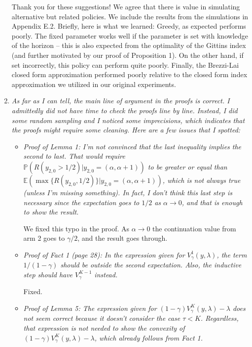 \documentclass[11pt]{article}
\newcommand{\1}{\ensuremath{\mathbf{1}}} %
\theoremstyle{thm-sf}
\begin{document}
\begin{enumerate}
	
	Thank you for these suggestions! We agree that there is value in simulating alternative but related policies. We include the results from the simulations in Appendix E.2. Briefly, here is what we learned: Greedy, as expected performs poorly. The fixed parameter works well if the parameter is set with knowledge of the horizon -- this is also expected from the optimality of the Gittins index (and further motivated by our proof of Proposition 1). On the other hand, if set incorrectly, this policy can perform quite poorly. Finally, the Brezzi-Lai closed form approximation performed poorly relative to the closed form index approximation we utilized in our original experiments. 
	
	

	\item {\it As far as I can tell, the main line of argument in the proofs is correct. I admittedly did not have time to check the proofs line by line. Instead, I did some random sampling and I noticed some imprecisions, which indicates that the proofs might require some cleaning. Here are a few issues that I spotted:}
		
		\begin{itemize}
			\item {\it Proof of Lemma 1: I'm not convinced that the last inequality implies the second to last.
			 That would require $\mathbb P(R(y_{2,0} > 1/2)| y_{2,0} = (\alpha, \alpha + 1))$ to be greater or equal than $\mathbb E (\max \{R(y_{2,0}, 1/2 )\} | y_{2,0} = (\alpha, \alpha + 1))$, which is not always true (unless I'm missing something).
			 In fact, I don't think this last step is necessary since the expectation goes to $1/2$ as $\alpha \to 0$, and that is enough to show the result.}
			 
			 We fixed this typo in the proof. As $\alpha \to 0$ the continuation value from arm 2 goes to $\gamma/2$, and the result goes through.
			 
			 \item {\it Proof of Fact 1 (page 28): In the expression given for $V^1_\gamma(y, \lambda)$, the term $1/(1-\gamma)$ should be outside the second expectation. Also, the inductive step should have $V^{K-1}_\gamma$ instead.}
			 
			 Fixed.
			 
			 \item {\it Proof of Lemma 5: The expression given for $(1 - \gamma) V_\gamma^K (y, \lambda) - \lambda$ does not seem correct because it doesn't consider the case $\tau < K$. Regardless, that expression is not needed to show the convexity of $(1 - \gamma) V_\gamma^K (y, \lambda) - \lambda$, which already follows from Fact 1.}
			 

\end{itemize}
\end{enumerate}
\end{document}
